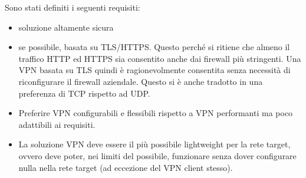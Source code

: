 Sono stati definiti i seguenti requisiti:
\begin{itemize}
    \item soluzione altamente sicura
    \item se possibile, basata su TLS/HTTPS. Questo perché si ritiene che
    almeno il traffico HTTP ed HTTPS sia consentito anche dai firewall
    più stringenti. Una VPN basata su TLS quindi è ragionevolmente consentita
    senza necessità di riconfigurare il firewall aziendale.
    Questo si è anche tradotto in una preferenza di TCP rispetto ad UDP.
    \item Preferire VPN configurabili e flessibili rispetto a
    VPN performanti ma poco adattibili ai requisiti.
    \item La soluzione VPN deve essere il più possibile lightweight
    per la rete target, ovvero deve poter, nei limiti del
    possibile, funzionare senza dover configurare nulla nella rete
    target (ad eccezione del VPN client stesso).
\end{itemize}